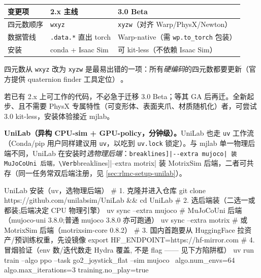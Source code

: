 \begin{center}
\small
\begin{tabular}{@{}lll@{}}
\toprule
变更项 & 2.x 主线 & 3.0 Beta \\
\midrule
四元数顺序 & \texttt{wxyz} & \texttt{xyzw}（对齐 Warp/PhysX/Newton） \\
数据管线 & \texttt{.data.*} 直出 torch & Warp-native（需 \texttt{wp.\allowbreak to\_torch} 包装） \\
安装 & conda + Isaac Sim & 可 kit-less（不依赖 Isaac Sim） \\
\bottomrule
\end{tabular}
\end{center}

四元数从 \verb|wxyz| 改为 \verb|xyzw| 是最易出错的一项：所有\emph{硬编码}的四元数都要更新（官方提供 quaternion finder 工具定位）\,\cite{isaaclab2024}。

\begin{note}[工程建议]
若已有 2.x 上可工作的代码，不必急于迁移 3.0 Beta；等其 GA 后再迁。全新起步、且不需要 PhysX 专属特性（可变形体、表面夹爪、材质随机化）者，可尝试 3.0 kit-less，安装体验接近 mjlab。
\end{note}

\textbf{UniLab（异构 CPU-sim + GPU-policy，分钟级）。}UniLab 也走 \verb|uv| 工作流（Conda/pip 用户同样建议用 \verb|uv|，以吃到 \verb|uv.lock| 锁定）。与 mjlab 单一物理后端不同，UniLab 在安装时\emph{选物理后端}：\Verb[breaklines]|--extra mujoco| 装 MuJoCoUni 后端，\Verb[breaklines]|--extra motrix| 装 MotrixSim 后端，二者可共存（同一任务常双后端注册，见 \cref{sec:rlmc-setup-unilab}）。

\begin{codebox}[bash]{UniLab 安装（uv，选物理后端）}
# 1. 克隆并进入仓库
git clone https://github.com/unilabsim/UniLab && cd UniLab
# 2. 选后端装（二选一或都装;后端决定 CPU 物理引擎）
uv sync --extra mujoco          # MuJoCoUni 后端（mujoco-uni 3.8.0;普通 mujoco 3.8.0 亦可跑通）
uv sync --extra motrix          # 或 MotrixSim 后端（motrixsim-core 0.8.2）
# 3. 国内首跑要从 HuggingFace 拉资产/预训练权重，先设镜像
export HF_ENDPOINT=https://hf-mirror.com
# 4. 冒烟验证（env 数/迭代数走 Hydra 覆盖, 不是 flag —— 见下方陷阱框）
uv run train --algo ppo --task go2_joystick_flat --sim mujoco \
    algo.num_envs=64 algo.max_iterations=3 training.no_play=true
\end{codebox}


